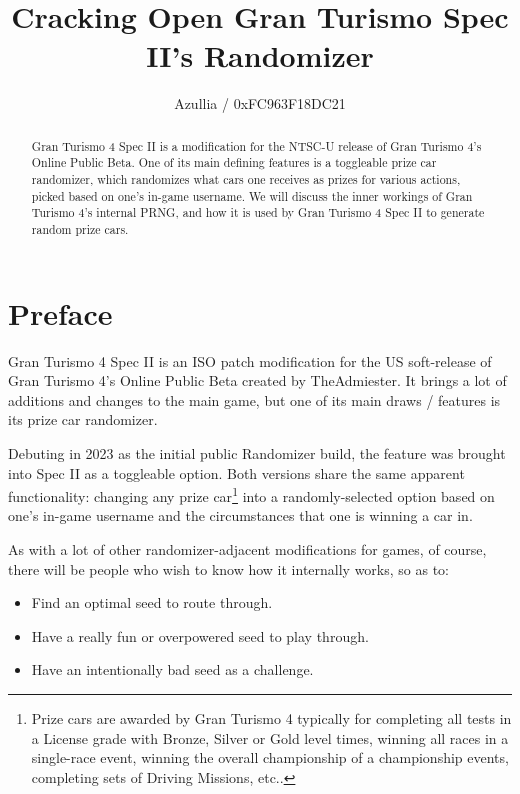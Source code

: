 \documentclass[14pt,a4paper,notitlepage]{extarticle}
\author{Azullia / 0xFC963F18DC21}
\title{\textbf{\huge{Cracking Open Gran Turismo Spec II's Randomizer}}}
\begin{document}
    \maketitle

    \begin{abstract}
        Gran Turismo 4 Spec II is a modification for the NTSC-U release of Gran Turismo 4's
        Online Public Beta. One of its main defining features is a toggleable prize car
        randomizer, which randomizes what cars one receives as prizes for various actions,
        picked based on one's in-game username. We will discuss the inner workings of Gran
        Turismo 4's internal PRNG, and how it is used by Gran Turismo 4 Spec II to generate
        random prize cars.
    \end{abstract}

    \section*{Preface}
        Gran Turismo 4 Spec II is an ISO patch modification for the US soft-release of
        Gran Turismo 4's Online Public Beta created by TheAdmiester. It brings a lot of
        additions and changes to the main game, but one of its main draws / features is
        its prize car randomizer.

        Debuting in 2023 as the initial public Randomizer build, the feature was brought into
        Spec II as a toggleable option. Both versions share the same apparent functionality:
        changing any prize car\footnote{Prize cars are awarded by Gran Turismo 4 typically for
        completing all tests in a License grade with Bronze, Silver or Gold level times,
        winning all races in a single-race event, winning the overall championship of a
        championship events, completing sets of Driving Missions, etc..} into a
        randomly-selected option based on one's in-game username and the circumstances that one
        is winning a car in.

        As with a lot of other randomizer-adjacent modifications for games, of course, there
        will be people who wish to know how it internally works, so as to:

        \begin{itemize}
            \item Find an optimal seed to route through.
            \item Have a really fun or overpowered seed to play through.
            \item Have an intentionally bad seed as a challenge.
        \end{itemize}
\end{document}
